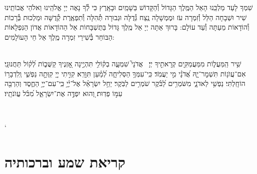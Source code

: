 \documentclass[twoside, openany, parskip=half, 11pt]{book}
\begin{document}
שִׁמְךָ לָעַד מַלְכֵּֽנוּ הָאֵל הַמֶּֽלֶךְ הַגָּדוֹל וְ֯הַקָּדוֹשׁ בַּשָׁמַֽיִם וּבָאָֽרֶץ כִּי לְ֯ךָ נָאֶה יְיָ אֱלֹהֵֽינוּ וֵאלֹהֵי אֲבוֹתֵֽינוּ שִׁיר וּשְׁבָחָה הַלֵּל וְ֯זִמְרָה עֹז וּמֶמְשָׁלָה נֶֽצַח גְּ֯דֻלָּה וּגְבוּרָה תְּ֯הִלָּה וְ֯תִפְאֶֽרֶת קְ֯דֻשָּׁה וּמַלְכוּת בְּ֯רָכוֹת וְ֯הוֹדָאוֹת מֵעַתָּה וְ֯עַד עוֹלָם: בָּרוּךְ אַתָּה יְיָ אֵל מֶֽלֶךְ גָּדוֹל בַּתֻּשְׁבָּחוֹת אֵל הַהוֹדָאוֹת אֲדוֹן הַנִּפְלָאוֹת הַבּוֹחֵר בְּ֯שִׁירֵי זִמְרָה מֶֽלֶךְ אֵל חֵי הָעוֹלָמִים:
\newcommand{\mimaamakim}{
\begin{sometimes}
\instruction{בעשי״ת והושענא רבא:}\\
שִׁ֥יר הַֽמַּעֲל֑וֹת מִמַּעֲמַקִּ֖ים קְרָאתִ֣יךָ יְיָ׃\ \break
אֲדֹנָי֮ שִׁמְעָ֢ה בְק֫וֹלִ֥י תִּהְיֶ֣ינָה אׇ֭זְנֶיךָ קַשֻּׁב֑וֹת לְ֝ק֗וֹל תַּחֲנוּנָֽי׃\hfill \break
אִם־עֲוֺנ֥וֹת תִּשְׁמׇר־יָ֑הּ אֲ֝דֹנָ֗י מִ֣י יַעֲמֹֽד׃\hfill \break
כִּֽי־עִמְּךָ֥ הַסְּלִיחָ֑ה לְ֝מַ֗עַן תִּוָּרֵֽא׃\hfill \break
קִוִּ֣יתִי יְיָ֭ קִוְּתָ֣ה נַפְשִׁ֑י וְֽלִדְבָר֥וֹ הוֹחָֽלְתִּי׃\hfill \break
נַפְשִׁ֥י לַאדֹנָ֑י מִשֹּׁמְרִ֥ים לַ֝בֹּ֗קֶר שֹׁמְרִ֥ים לַבֹּֽקֶר׃\hfill \break
יַחֵ֥ל יִשְׂרָאֵ֗ל אֶל־יְ֫יָ֥ כִּֽי־עִם־יְיָ֥ הַחֶ֑סֶד וְהַרְבֵּ֖ה עִמּ֣וֹ פְדֽוּת׃\hfill \break
וְ֭הוּא יִפְדֶּ֣ה אֶת־יִשְׂרָאֵ֑ל מִ֝כֹּ֗ל עֲוֺנֹתָֽיו׃ \hfill \break
\end{sometimes}
}
\mimaamakim
\\
\halfkaddish

\enlargethispage{\baselineskip}

`\vspace{1.25\baselineskip}
\chapter[שחרית לחול]{קריאת שמע וברכותיה}
\newcommand{\barachu}{
\begin{minipage}{0.6\textwidth}
\leftskip=0pt plus-.5fil
\rightskip=0pt plus.5fil
\parfillskip=0pt plus1fil
\begin{large}

\shatz
\begin{Large}\textbf{בָּרְ֯כוּ אֶת־יְיָ הַמְ֯בֹרָךְ:}\end{Large}
\end{large}

\vspace{12pt}

\shatzvkahal
בָּרוּךְ יְיָ הַמְ֯בֹרָךְ לְ֯עוֹלָם וָעֶד:
\end{minipage}
ֺֺ%

%
}
\end{document}
